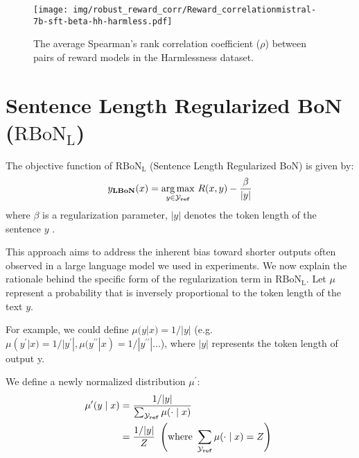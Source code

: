 \begin{figure}[htbp]
    \centering
    \texttt{[image: img/robust\_reward\_corr/Reward\_correlationmistral-7b-sft-beta-hh-harmless.pdf]}
    \caption{
    The average Spearman's rank correlation coefficient ($\rho$) between pairs of reward models in the Harmlessness dataset.
    }
\end{figure}
\newpage

\section{Sentence Length Regularized BoN ($\mathrm{RBoN}_{\mathrm{L}}$)}\label{appendix:length}
The objective function of $\mathrm{RBoN}_{\mathrm{L}}$ (Sentence Length Regularized BoN) is given by:
\begin{equation*}
y_{\textbf{LBoN}}(x)=\underset{y \in \mathcal{Y}_{\textnormal{\textbf{ref}}}}{\arg \max }\,\, R(x, y)-\frac{\beta}{|y|}
\end{equation*}
where $\beta$ is a regularization parameter, $|y|$ denotes the token length of the sentence $y$ .

This approach aims to address the inherent bias toward shorter outputs often observed in a large language model we used in experiments. We now explain the rationale behind the specific form of the regularization term in $\mathrm{RBoN}_{\mathrm{L}}$. Let $\mu$ represent a probability that is inversely proportional to the token length of the text $y$. 

For example, we could define $\mu(y|x) = 1/|y|$ (e.g. $\mu(y^\prime|x) = 1/|y^\prime|, \mu(y^{\prime\prime}|x) = 1/|y^{\prime\prime}|$...), where $|y|$ represents the token length of output y. 
\begin{definition}\label{definition:length}
We define a newly normalized distribution $\mu^\prime$:
\begin{equation*}
\begin{aligned}
\mu^\prime (y\mid x) &= \frac{1/|y|}{\sum_{\mathcal{Y}_{\textnormal{\textbf{ref}}}} \mu(\cdot \mid x)} \\
&= \frac{1/|y|}{Z}\, \, \left( \mathrm{where} \,\,\sum_{\mathcal{Y}_{\textnormal{\textbf{ref}}}} \mu (\cdot \mid x) = Z\right)\
\end{aligned}
\end{equation*}
\end{definition}

